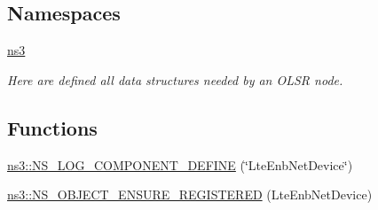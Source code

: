 \subsection*{Namespaces}
\begin{DoxyCompactItemize}
\item 
 \hyperlink{namespacens3}{ns3}
\begin{DoxyCompactList}\small\item\em Here are defined all data structures needed by an O\+L\+SR node. \end{DoxyCompactList}\end{DoxyCompactItemize}
\subsection*{Functions}
\begin{DoxyCompactItemize}
\item 
\hyperlink{namespacens3_a59d02638a4565fdcf3d248ae40e671da}{ns3\+::\+N\+S\+\_\+\+L\+O\+G\+\_\+\+C\+O\+M\+P\+O\+N\+E\+N\+T\+\_\+\+D\+E\+F\+I\+NE} (\char`\"{}Lte\+Enb\+Net\+Device\char`\"{})
\item 
\hyperlink{namespacens3_a6e97b263ab1676232682d71a706df1eb}{ns3\+::\+N\+S\+\_\+\+O\+B\+J\+E\+C\+T\+\_\+\+E\+N\+S\+U\+R\+E\+\_\+\+R\+E\+G\+I\+S\+T\+E\+R\+ED} (Lte\+Enb\+Net\+Device)
\end{DoxyCompactItemize}
